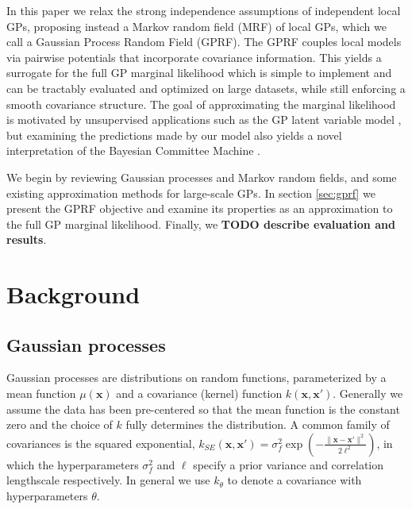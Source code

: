 \documentclass{article}
\renewcommand{\v}[1]{\mathbf{#1}}
\begin{document}
In this paper we relax the strong independence assumptions of
independent local GPs, proposing instead a Markov random field (MRF) of
local GPs, which we call a Gaussian Process Random Field (GPRF). The
GPRF couples local models via pairwise potentials that incorporate
covariance information. This yields a surrogate for the full GP
marginal likelihood which is simple to implement and 
can be tractably evaluated and optimized on
large datasets, while still enforcing a smooth covariance
structure. The goal of approximating the marginal likelihood is
motivated by unsupervised applications such as the GP latent variable
model \cite{}, but examining the predictions made by our model also
yields a novel interpretation of the Bayesian Committee Machine \cite{}.

We begin by reviewing Gaussian processes and Markov random fields, and
some existing approximation methods for large-scale GPs. In
section \ref{sec:gprf} we present the GPRF objective and examine its
properties as an approximation to the full GP marginal likelihood.  Finally,
we {\bf TODO describe evaluation and results}.


\section{Background}

\subsection{Gaussian processes}
Gaussian processes \citep{rasmussenwilliams06} are
distributions on random functions, parameterized by a mean function
$\mu(\v{x})$ and a covariance (kernel) function $k(\v{x},
\v{x}')$. Generally we assume the data has been pre-centered so that
the mean function is the constant zero and the choice of $k$ fully
determines the distribution. A common family of covariances is the squared
exponential, $k_{SE}(\v{x}, \v{x}') =
\sigma^2_f\exp\left(-\frac{\|\v{x}-\v{x}'\|^2}{2\ell^2}\right)$, in
which the hyperparameters $\sigma^2_f$  and $\ell$ specify a prior variance
and correlation lengthscale respectively.
In general we use $k_\theta$ to denote a covariance with
hyperparameters $\theta$. 
\end{document}
